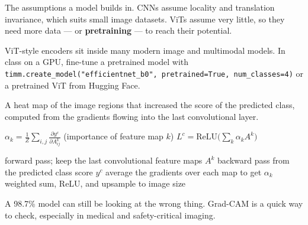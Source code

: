 \documentclass[11pt,a4paper]{article}
\begin{document}
\begin{bdef}
The assumptions a model builds in. CNNs assume locality and translation invariance, which suits small image datasets. ViTs assume very little, so they need more data --- or \textbf{pretraining} --- to reach their potential.
\end{bdef}
\begin{bapp}
ViT-style encoders sit inside many modern image and multimodal models. In class on a GPU, fine-tune a pretrained model with \texttt{timm.create\_model("efficientnet\_b0", pretrained=True, num\_classes=4)} or a pretrained ViT from Hugging Face.
\end{bapp}

\begin{bdef}
A heat map of the image regions that increased the score of the predicted class, computed from the gradients flowing into the last convolutional layer.
\end{bdef}
\begin{bmath}[Formula]
$\alpha_k=\frac{1}{Z}\sum_{i,j}\frac{\partial y^c}{\partial A^k_{ij}}$ (importance of feature map $k$) \qquad $L^c=\mathrm{ReLU}\big(\sum_k\alpha_kA^k\big)$
\end{bmath}
\begin{balgo}
\begin{algorithmic}[1]
\State forward pass; keep the last convolutional feature maps $A^k$
\State backward pass from the predicted class score $y^c$
\State average the gradients over each map to get $\alpha_k$
\State weighted sum, ReLU, and upsample to image size
\end{algorithmic}
\end{balgo}
\begin{bwarn}
A 98.7\% model can still be looking at the wrong thing. Grad-CAM is a quick way to check, especially in medical and safety-critical imaging.
\end{bwarn}

\end{document}
